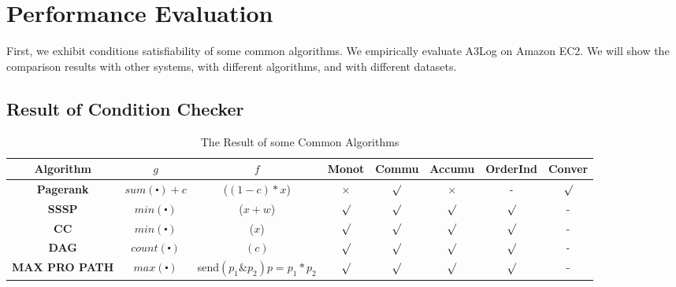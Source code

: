 \section{Performance Evaluation}
\label{sec:expr}

First, we exhibit conditions satisfiability of some common algorithms.
We empirically evaluate A3Log on Amazon EC2. We will show the comparison results with other systems, with different algorithms, and with different datasets.
\subsection{Result of Condition Checker}
\begin{table}[!t]
	\caption{The Result of some Common Algorithms }
	\hspace{-0.15in}
	\vspace{0.0in}
	\label{tab:resut}
	\centering
	\small
	\begin{tabular}{c|c|c|c|c|c|c|c}
		\hline\hline
		 {\textbf{Algorithm}} &
		 {\textbf{$g$}} &
		 {\textbf{$f$}} & 
		 {\textbf{Monot}} &
		 {\textbf{Commu}} & 
		 {\textbf{Accumu}} & 
		 {\textbf{OrderInd}} &
		 {\textbf{Conver}}\\
		\hline
		\textbf{Pagerank} & $sum(\centerdot)+c$ &($(1-c)*x$)   &$\times$ & $\surd$ & $\times$  & - &$\surd$\\
		\hline
		\textbf{SSSP} & $min(\centerdot)$ & ($x+w$) &$\surd$ & $\surd$& $\surd$ & $\surd$ & -\\
		\hline
		\textbf{CC} & $min(\centerdot)$& ($x$) & $\surd$ & $\surd$ & $\surd$ & $\surd$ & -\\
		\hline
		\textbf{DAG} & $count(\centerdot)$ &$(c)$& $\surd$ &$\surd$& $\surd$ & $\surd$ & -\\
		\hline
		\textbf{MAX PRO PATH} & $max(\centerdot)$ &  send$(p_1\& p_2) p=p_1*p_2$ & $\surd$ & $\surd$ & $\surd$ & $\surd$ & -\\

\end{tabular}
\end{table}

